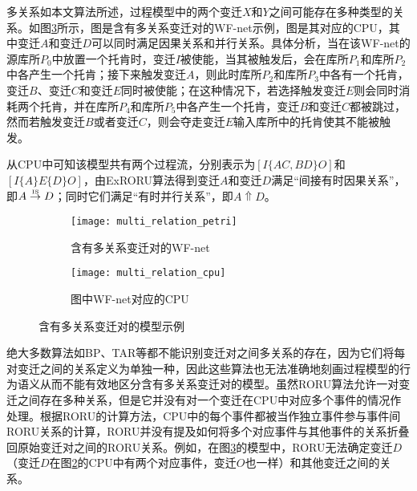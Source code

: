 {\heiti 多关系\qquad}如本文算法所述，过程模型中的两个变迁$X$和$Y$之间可能存在多种类型的关系。如图\ref{fig:multi_relation}所示，图是含有多关系变迁对的WF-net示例，图是其对应的CPU，其中变迁$A$和变迁$D$可以同时满足因果关系和并行关系。具体分析，当在该WF-net的源库所$P_{0}$中放置一个托肯时，变迁$I$被使能，当其被触发后，会在库所$P_{1}$和库所$P_{2}$中各产生一个托肯；接下来触发变迁$A$，则此时库所$P_{2}$和库所$P_{3}$中各有一个托肯，变迁$B$、变迁$C$和变迁$E$同时被使能；在这种情况下，若选择触发变迁$E$则会同时消耗两个托肯，并在库所$P_{4}$和库所$P_{5}$中各产生一个托肯，变迁$B$和变迁$C$都被跳过，然而若触发变迁$B$或者变迁$C$，则会夺走变迁$E$输入库所中的托肯使其不能被触发。

从CPU中可知该模型共有两个过程流，分别表示为$[I\{AC,BD\}O]$和$[I\{A\}E\{D\}O]$，由ExRORU算法得到变迁$A$和变迁$D$满足“间接有时因果关系”，即$A\overset{\text{\tiny{IS}}}{\rightarrow}D$；同时它们满足“有时并行关系”，即$A\Uparrow D$。

\begin{figure}[htbp]
  \centering
  \begin{subfigure}{1\textwidth}
    \centering
    \texttt{[image: multi\_relation\_petri]}
    \caption{含有多关系变迁对的WF-net}
    \label{fig:multi_relation_petri}
  \end{subfigure}
  \begin{subfigure}{1\textwidth}
    \vspace{1em}
    \centering
    \texttt{[image: multi\_relation\_cpu]}
    \caption{图中WF-net对应的CPU}
    \label{fig:multi_relation_cpu}
  \end{subfigure}
  \vspace{6pt}
  \caption{含有多关系变迁对的模型示例}
  \label{fig:multi_relation}
\end{figure}

绝大多数算法如BP、TAR等都不能识别变迁对之间多关系的存在，因为它们将每对变迁之间的关系定义为单独一种，因此这些算法也无法准确地刻画过程模型的行为语义从而不能有效地区分含有多关系变迁对的模型。虽然RORU算法允许一对变迁之间存在多种关系，但是它并没有对一个变迁在CPU中对应多个事件的情况作处理。根据RORU的计算方法，CPU中的每个事件都被当作独立事件参与事件间RORU关系的计算，RORU并没有提及如何将多个对应事件与其他事件的关系折叠回原始变迁对之间的RORU关系。例如，在图\ref{fig:multi_relation}的模型中，RORU无法确定变迁$D$（变迁$D$在图\ref{fig:multi_relation_cpu}的CPU中有两个对应事件，变迁$O$也一样）和其他变迁之间的关系。

